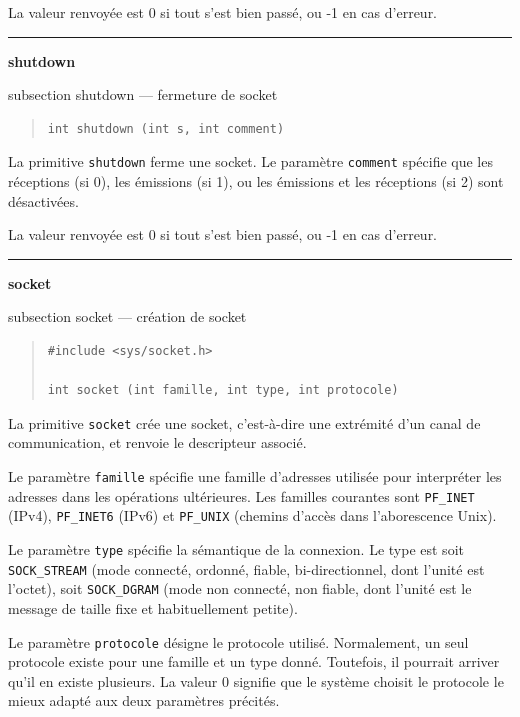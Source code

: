 \documentclass [twoside] {report}
\newcommand {\primitive} [1]
    {
	\phantomsection
	{\large \textbf {#1}}
	\addcontentsline {toc} {subsection} {#1}
    }
\newcommand {\separation}
    {
	\vspace {5mm}
	\nopagebreak
	\hrule
    }
\begin{document}
La valeur renvoyée est 0 si tout s'est bien passé, ou -1 en
cas d'erreur.



\separation
\primitive {shutdown} --- fermeture de socket

\begin {quote}
\begin {verbatim}
int shutdown (int s, int comment)
\end{verbatim}
\end {quote}

La primitive \texttt {shutdown} ferme une socket. Le paramètre
\texttt {comment} spécifie que les réceptions (si 0), les
émissions (si 1), ou les émissions et les réceptions (si 2) sont
désactivées.

La valeur renvoyée est 0 si tout s'est bien passé, ou -1 en
cas d'erreur.



\separation
\primitive {socket} --- création de socket

\begin {quote}
\begin {verbatim}
#include <sys/socket.h>

int socket (int famille, int type, int protocole)
\end{verbatim}
\end {quote}

La primitive \texttt {socket} crée une socket, c'est-à-dire
une extrémité d'un canal de communication, et renvoie le
descripteur associé.

Le paramètre \texttt {famille} spécifie une famille d'adresses utilisée
pour interpréter les adresses dans les opérations ultérieures. Les
familles courantes sont \texttt {PF\_INET} (IPv4), \texttt {PF\_INET6}
(IPv6) et \texttt {PF\_UNIX} (chemins d'accès dans l'aborescence Unix).

Le paramètre \texttt {type} spécifie la sémantique de la
connexion. Le type est soit \texttt {SOCK\_STREAM} (mode
connecté, ordonné, fiable, bi-directionnel, dont l'unité est
l'octet), soit \texttt {SOCK\_DGRAM} (mode non connecté, non
fiable, dont l'unité est le message de taille fixe et
habituellement petite).

Le paramètre \texttt {protocole} désigne le protocole utilisé.
Normalement, un seul protocole existe pour une famille et un
type donné. Toutefois, il pourrait arriver qu'il en existe
plusieurs. La valeur 0 signifie que le système choisit le
protocole le mieux adapté aux deux paramètres précités.
\end{document}
